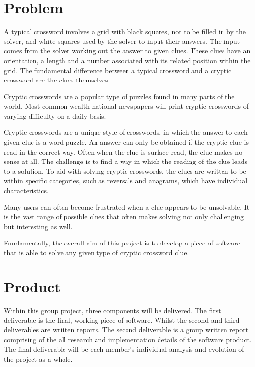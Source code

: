 \section{Problem}

A typical crossword involves a grid with black squares, not to be filled in by
the  solver, and white squares used by the solver to input their answers. The
input comes from the solver working out the answer to given clues. These clues
have an orientation, a length and a number associated with its related position
within the grid. The fundamental difference between a typical crossword and a
cryptic crossword are the clues themselves.

Cryptic crosswords are a popular type of puzzles found in many parts of the
world. Most common-wealth national newspapers will print cryptic crosswords of
varying difficulty on a daily basis.

Cryptic crosswords are a unique style of crosswords, in which the answer to
each given clue is a word puzzle. An answer can only be obtained if the cryptic
clue is read in the correct way. Often when the clue is surface read, the clue
makes no sense at all. The challenge is to find a way in which the reading of
the clue leads to a solution. To aid with solving cryptic crosswords, the clues
are written to be within specific categories, such as reversals and anagrams,
which have individual characteristics.

Many users can often become frustrated when a clue appears to be unsolvable. It
is the vast range of possible clues that often makes solving not only
challenging but interesting as well.

Fundamentally, the overall aim of this project is to develop a piece of
software that is able to solve any given type of cryptic crossword clue.


\section{Product}

Within this group project, three components will be delivered. The first 
deliverable is the final, working piece of software. Whilst the second and third
deliverables are written reports. The second deliverable is a group written 
report comprising of the all research and implementation details of the software
product. The final deliverable will be each member's individual analysis and 
evolution of the project as a whole.

